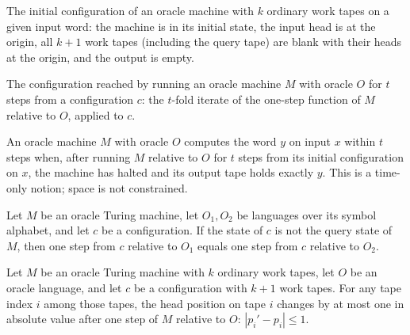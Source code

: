 \begin{definition}
\label{Turing.OracleTM.initCfg}
\leanok
{}
The initial configuration of an oracle machine with $k$ ordinary work tapes on
a given input word: the machine is in its initial state, the input head is at
the origin, all $k+1$ work tapes (including the query tape) are blank with
their heads at the origin, and the output is empty.
\end{definition}

\begin{definition}
\label{Turing.OracleTM.runFrom}
\leanok
{}
The configuration reached by running an oracle machine $M$ with oracle $O$ for
$t$ steps from a configuration $c$: the $t$-fold iterate of the one-step
function of $M$ relative to $O$, applied to $c$.
\end{definition}

\begin{definition}
\label{Turing.OracleTM.ComputesInTime}
\leanok
{}
An oracle machine $M$ with oracle $O$ computes the word $y$ on input $x$
within $t$ steps when, after running $M$ relative to $O$ for $t$ steps from
its initial configuration on $x$, the machine has halted and its output tape
holds exactly $y$.  This is a time-only notion; space is not constrained.
\end{definition}

\begin{theorem}
\label{Turing.OracleTM.step_eq_of_ne_qQuery}
\leanok
{}
Let $M$ be an oracle Turing machine, let $O_1,O_2$ be languages over its symbol
alphabet, and let $c$ be a configuration. If the state of $c$ is not the query state of
$M$, then one step from $c$ relative to $O_1$ equals one step from $c$ relative to
$O_2$.
\end{theorem}

\begin{lemma}
\label{Turing.OracleTM.workTapePos_step_le}
\leanok
{}
Let $M$ be an oracle Turing machine with $k$ ordinary work tapes, let $O$ be an oracle
language, and let $c$ be a configuration with $k+1$ work tapes. For any tape index $i$
among those tapes, the head position on tape $i$ changes by at most one in absolute
value after one step of $M$ relative to $O$: $\left|p_i'-p_i\right|\le 1$.
\end{lemma}


